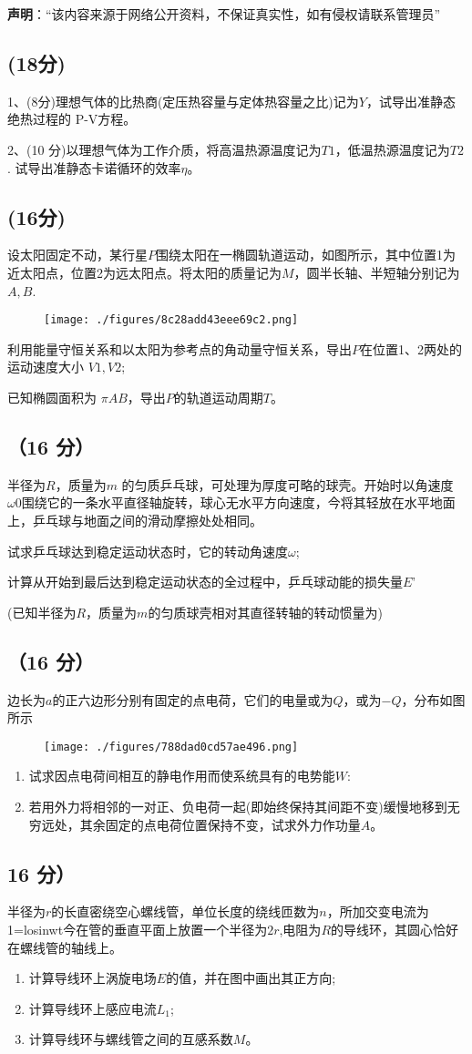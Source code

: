 
\textbf{声明}：“该内容来源于网络公开资料，不保证真实性，如有侵权请联系管理员”

\subsection{(18分)}
1、(8分)理想气体的比热商(定压热容量与定体热容量之比)记为$Y$，试导出准静态绝热过程的 P-V方程。

2、(10 分)以理想气体为工作介质，将高温热源温度记为$T1$，低温热源温度记为$T2$.
试导出准静态卡诺循环的效率$\eta$。
\subsection{(16分)}
设太阳固定不动，某行星$P$围绕太阳在一椭圆轨道运动，如图所示，其中位置1为近太阳点，位置2为远太阳点。将太阳的质量记为$M$，圆半长轴、半短轴分别记为$A,B$.
\begin{figure}[ht]
\centering
\texttt{[image: ./figures/8c28add43eee69c2.png]}
\caption{} \label{fig_PKU200_1}
\end{figure}
利用能量守恒关系和以太阳为参考点的角动量守恒关系，导出$P$在位置1、2两处的运动速度大小 $V1,V2$;

已知椭圆面积为 $\pi AB$，导出$P$的轨道运动周期$T$。
\subsection{（16 分）}
半径为$R$，质量为$m$ 的匀质乒乓球，可处理为厚度可略的球壳。开始时以角速度$\omega0$围绕它的一条水平直径轴旋转，球心无水平方向速度，今将其轻放在水平地面上，乒乓球与地面之间的滑动摩擦处处相同。

试求乒乓球达到稳定运动状态时，它的转动角速度$\omega$;

计算从开始到最后达到稳定运动状态的全过程中，乒乓球动能的损失量$E$'

(已知半径为$R$，质量为$m$的匀质球壳相对其直径转轴的转动惯量为)
\subsection{（16 分）}
边长为$a$的正六边形分别有固定的点电荷，它们的电量或为$Q$，或为$-Q$，分布如图所示
\begin{figure}[ht]
\centering
\texttt{[image: ./figures/788dad0cd57ae496.png]}
\caption{} \label{fig_PKU200_2}
\end{figure}
\begin{enumerate}
\item 试求因点电荷间相互的静电作用而使系统具有的电势能$W$:
\item 若用外力将相邻的一对正、负电荷一起(即始终保持其间距不变)缓慢地移到无穷远处，其余固定的点电荷位置保持不变，试求外力作功量$A$。
\end{enumerate}
\subsection{16 分）}
半径为$r$的长直密绕空心螺线管，单位长度的绕线匝数为$n$，所加交变电流为1=losinwt今在管的垂直平面上放置一个半径为$2r$,电阻为$R$的导线环，其圆心恰好在螺线管的轴线上。
\begin{enumerate}
\item 计算导线环上涡旋电场$E$的值，并在图中画出其正方向;
\item 计算导线环上感应电流$L_1$;
\item 计算导线环与螺线管之间的互感系数$M$。
\end{enumerate}

